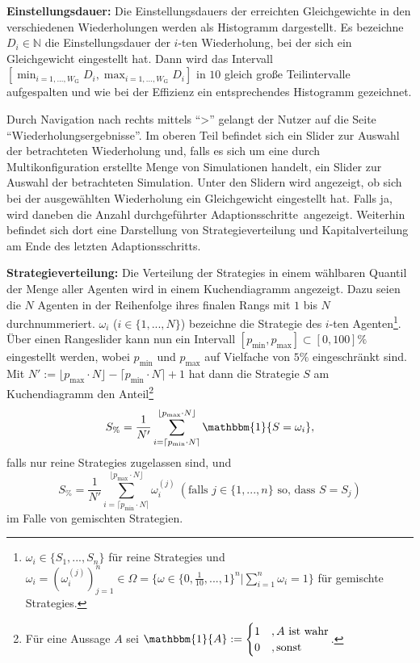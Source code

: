 \documentclass[parskip=full,11pt]{scrartcl}
\def\adapt{Adaptionsschritt}
\def\adapts{Adaptionsschritte}
\begin{document}
\textbf{\Gls{Einstellungsdauer}:}
Die \Glspl{Einstellungsdauer} der erreichten Gleichgewichte in den verschiedenen Wiederholungen werden als Histogramm dargestellt. Es bezeichne \(D_i \in \mathbb{N}\) die \Gls{Einstellungsdauer} der \(i\)-ten Wiederholung, bei der sich ein Gleichgewicht eingestellt hat. Dann wird das Intervall \([\min_{i = 1,...,W_\text{G}} D_i, \max_{i = 1,...,W_\text{G}} D_i]\) in \(10\) gleich große Teilintervalle aufgespalten und wie bei der \Gls{Effizienz} ein entsprechendes Histogramm gezeichnet.

Durch Navigation nach rechts mittels \enquote{>} gelangt der \Gls{Nutzer} auf die Seite \enquote{Wiederholungsergebnisse}. Im oberen Teil befindet sich ein Slider zur Auswahl der betrachteten Wiederholung und, falls es sich um eine durch Multikonfiguration erstellte Menge von Simulationen handelt, ein Slider zur Auswahl der betrachteten Simulation. Unter den Slidern wird angezeigt, ob sich bei der ausgewählten Wiederholung ein Gleichgewicht eingestellt hat. Falls ja, wird daneben die Anzahl durchgeführter \adapts\ angezeigt. Weiterhin befindet sich dort eine Darstellung von Strategieverteilung und Kapitalverteilung am Ende des letzten \adapt s.

\textbf{Strategieverteilung:}
Die Verteilung der \Glspl{Strategie} in einem wählbaren Quantil der Menge aller Agenten wird in einem Kuchendiagramm angezeigt. Dazu seien die \(N\) Agenten in der Reihenfolge ihres finalen Rangs mit \(1\) bis \(N\) durchnummeriert. \(\omega_i\) (\(i \in \{1,...,N\}\)) bezeichne die \Gls{Strategie} des \(i\)-ten Agenten\footnote{\(\omega_i \in \{S_1,...,S_n\}\) für reine \Glspl{Strategie} und \(\omega_i = (\omega_i^{(j)})_{j=1}^n \in \Omega = \{\omega \in \{0,\frac{1}{10},...,1\}^n | \sum_{i=1}^n \omega_i = 1\}\) für \glspl{gemischte Strategie}.}. Über einen Rangeslider kann nun ein Intervall \([p_\text{min},p_\text{max}] \subset [0,100]\%\) eingestellt werden, wobei \(p_\text{min}\) und \(p_\text{max}\) auf Vielfache von \(5\%\) eingeschränkt sind. Mit \(N' := \lfloor p_\text{max} \cdot N \rfloor - \lceil p_\text{min} \cdot N \rceil + 1\) hat dann die \Gls{Strategie} \(S\) am Kuchendiagramm den Anteil\footnote{Für eine Aussage \(A\) sei \(\mathbbm{1}\{A\} := \begin{cases} 1 & , A \text{ ist wahr} \\ 0 &, \text{sonst}\end{cases}\).}
\[
S_\% = \frac{1}{N'} \sum_{i=\lceil p_\text{min} \cdot N \rceil}^{\lfloor p_\text{max} \cdot N \rfloor} \mathbbm{1}\{S = \omega_i\},
\]
falls nur reine \Glspl{Strategie} zugelassen sind, und
\[
S_\% = \frac{1}{N'} \sum_{i=\lceil p_\text{min} \cdot N \rceil}^{\lfloor p_\text{max} \cdot N \rfloor} \omega_i^{(j)}  \ (\text{falls } j \in \{1,...,n\} \text{ so, dass } S = S_j)
\]
im Falle von gemischten Strategien.
\end{document}
